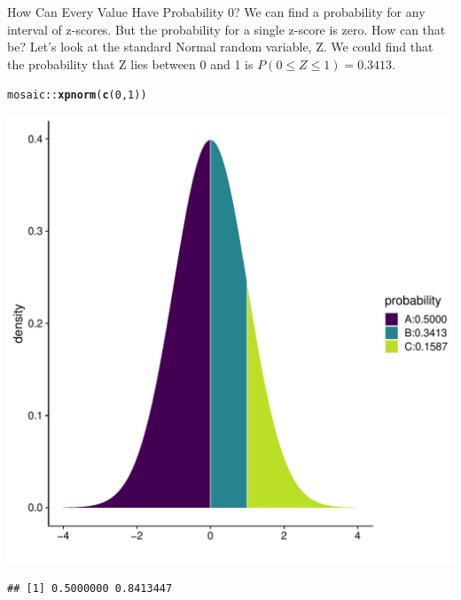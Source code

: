 \documentclass[10pt,handout]{beamer}\usepackage[]{graphicx}\usepackage[]{color}
\makeatletter
\newcommand{\hlnum}[1]{\textcolor[rgb]{0.686,0.059,0.569}{#1}}%
\newcommand{\hlopt}[1]{\textcolor[rgb]{0,0,0}{#1}}%
\newcommand{\hlstd}[1]{\textcolor[rgb]{0.345,0.345,0.345}{#1}}%
\newcommand{\hlkwd}[1]{\textcolor[rgb]{0.737,0.353,0.396}{\textbf{#1}}}%
\newenvironment{kframe}{%
 \def\at@end@of@kframe{}%
 \ifinner\ifhmode%
  \def\at@end@of@kframe{\end{minipage}}%
  \begin{minipage}{\columnwidth}%
 \fi\fi%
 \def\FrameCommand##1{\hskip\@totalleftmargin \hskip-\fboxsep
 \colorbox{shadecolor}{##1}\hskip-\fboxsep
     \hskip-\linewidth \hskip-\@totalleftmargin \hskip\columnwidth}%
 \MakeFramed {\advance\hsize-\width
   \@totalleftmargin\z@ \linewidth\hsize
   \@setminipage}}%
 {\par\unskip\endMakeFramed%
 \at@end@of@kframe}
\newenvironment{knitrout}{}{} %
\makeatother
\begin{document}
\begin{frame}[fragile]{How Can Every Value Have Probability 0?}
We can find a probability for any interval of z-scores. But the
probability for a single z-score is zero. How can that be? Let's
look at the standard Normal random variable, Z. We could
find that the
probability that Z lies between 0 and 1 is $P(0 \leq Z \leq 1)=0.3413$.

\begin{knitrout}\tiny
{}\color{fgcolor}\begin{kframe}
\begin{alltt}
\hlstd{mosaic}\hlopt{::}\hlkwd{xpnorm}\hlstd{(}\hlkwd{c}\hlstd{(}\hlnum{0}\hlstd{,}\hlnum{1}\hlstd{))}
\end{alltt}
\end{kframe}

{\centering \includegraphics[width=0.60\linewidth]{figure/unnamed-chunk-1-1} 

}


\begin{kframe}\begin{verbatim}
## [1] 0.5000000 0.8413447
\end{verbatim}
\end{kframe}
\end{knitrout}
\end{frame}
\end{document}
